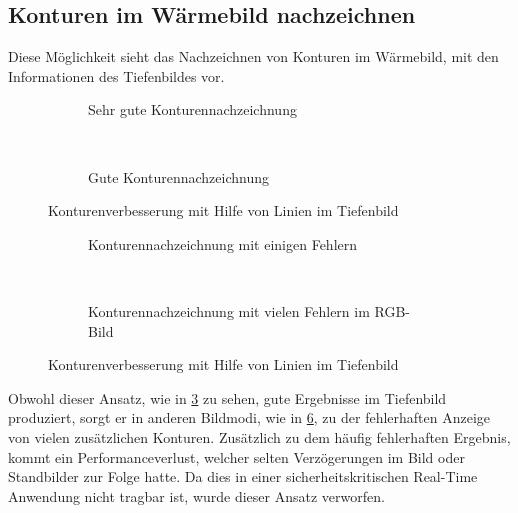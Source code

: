 \subsection{Konturen im Wärmebild nachzeichnen}
\label{sec:fusion_lines}
Diese Möglichkeit sieht das Nachzeichnen von Konturen im Wärmebild, mit den Informationen des Tiefenbildes vor.
\begin{figure}[H]
	\centering
	\begin{subfigure}[t]{0.45\textwidth}
		\centering
		\caption{Sehr gute Konturennachzeichnung}
		\label{fig:fusion_lines3}
	\end{subfigure}
	~
	\begin{subfigure}[t]{0.45\textwidth}
		\centering
		\caption{Gute Konturennachzeichnung}
		\label{fig:fusion_lines1}
	\end{subfigure}
	\caption{Konturenverbesserung mit Hilfe von Linien im Tiefenbild}
	\label{fig:fusion_lines_good}
\end{figure}
\begin{figure}[H]
	\centering
	\begin{subfigure}[t]{0.55\textwidth}
		\centering
		\caption{Konturennachzeichnung mit einigen Fehlern}
		\label{fig:fusion_lines2}
	\end{subfigure}
	~
	\begin{subfigure}[t]{0.35\textwidth}
		\centering
		\caption{Konturennachzeichnung mit vielen Fehlern im RGB-Bild}
		\label{fig:fusion_lines}
	\end{subfigure}
	\caption{Konturenverbesserung mit Hilfe von Linien im Tiefenbild}
	\label{fig:fusion_lines_bad}
\end{figure}

Obwohl dieser Ansatz, wie in \cref{fig:fusion_lines_good} zu sehen, gute Ergebnisse im Tiefenbild produziert, sorgt er in anderen Bildmodi, wie in \cref{fig:fusion_lines_bad}, zu der fehlerhaften Anzeige von vielen zusätzlichen Konturen.
Zusätzlich zu dem häufig fehlerhaften Ergebnis, kommt ein Performanceverlust, welcher selten Verzögerungen im Bild oder Standbilder zur Folge hatte.
Da dies in einer sicherheitskritischen Real-Time Anwendung nicht tragbar ist, wurde dieser Ansatz verworfen.

